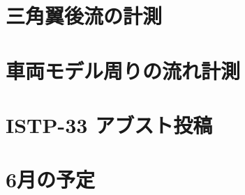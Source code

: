 \documentclass[twocolumn,a4j]{jsarticle}
\begin{document}
\section{三角翼後流の計測}

\section{車両モデル周りの流れ計測}

\section{ISTP-33 アブスト投稿}

\section{6月の予定}
\end{document}
